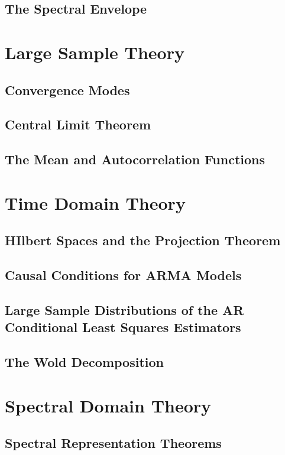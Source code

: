 \documentclass[12pt]{article}
\begin{document}
\subsection{The Spectral Envelope}


\section{Large Sample Theory}
\subsection{Convergence Modes}

\subsection{Central Limit Theorem}

\subsection{The Mean and Autocorrelation Functions}


\section{Time Domain Theory}
\subsection{HIlbert Spaces and the Projection Theorem}

\subsection{Causal Conditions for ARMA Models}

\subsection{Large Sample Distributions of the AR Conditional Least Squares Estimators}

\subsection{The Wold Decomposition} 


\section{Spectral Domain Theory}
\subsection{Spectral Representation Theorems}
\end{document}
